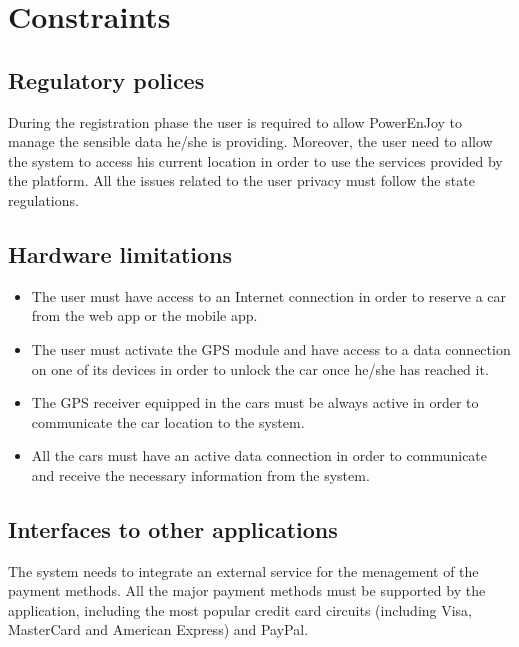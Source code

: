 \section{Constraints}
\subsection{Regulatory polices}
During the registration phase the user is required to allow PowerEnJoy to manage the sensible data he/she is providing. Moreover, the user need to allow the system to access his current location in order to use the services provided by the platform. All the issues related to the user privacy must follow the state regulations.

\subsection{Hardware limitations}
\begin{itemize}
	\item The user must have access to an Internet connection in order to reserve a car from the web app or the mobile app.
	\item The user must activate the GPS module and have access to a data connection on one of its devices in order to unlock the car once he/she has reached it.
	\item The GPS receiver equipped in the cars must be always active in order to communicate the car location to the system.
	\item All the cars must have an active data connection in order to communicate and receive the necessary information from the system.
\end{itemize}

\subsection{Interfaces to other applications}
The system needs to integrate an external service for the menagement of the payment methods. All the major payment methods must be supported by the application, including the most popular credit card circuits (including Visa, MasterCard and American Express) and PayPal.